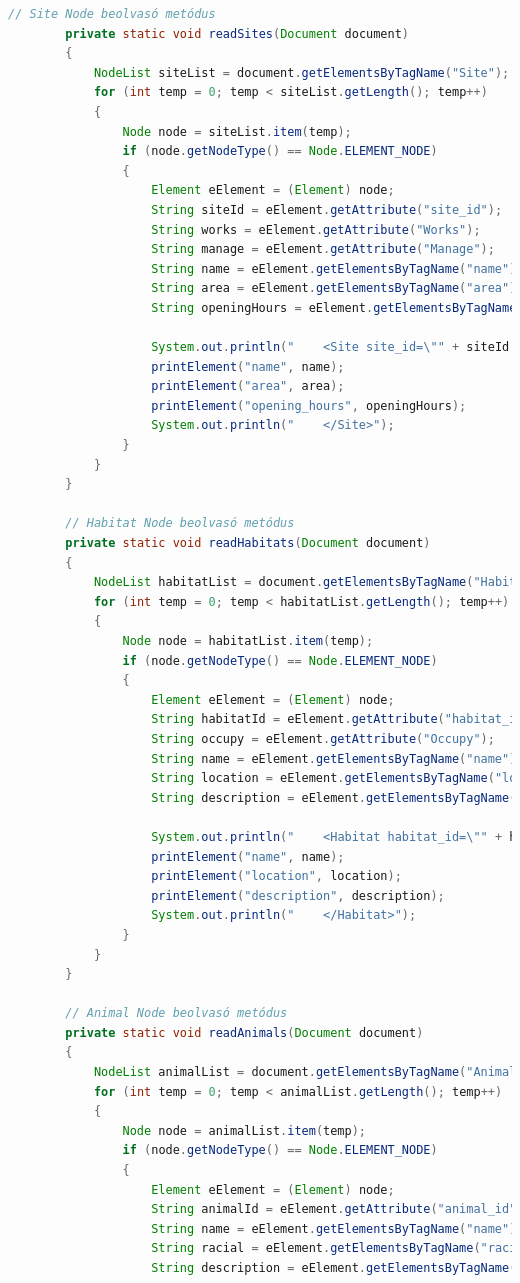 \documentclass[12pt]{report}
\begin{document}
\begin{lstlisting}[caption={DOMReadKLNSPG.java} olvasó program, language=Java]
		// Site Node beolvasó metódus
		private static void readSites(Document document) 
		{
			NodeList siteList = document.getElementsByTagName("Site");
			for (int temp = 0; temp < siteList.getLength(); temp++) 
			{
				Node node = siteList.item(temp);
				if (node.getNodeType() == Node.ELEMENT_NODE) 
				{
					Element eElement = (Element) node;
					String siteId = eElement.getAttribute("site_id");
					String works = eElement.getAttribute("Works");
					String manage = eElement.getAttribute("Manage");
					String name = eElement.getElementsByTagName("name").item(0).getTextContent();
					String area = eElement.getElementsByTagName("area").item(0).getTextContent();
					String openingHours = eElement.getElementsByTagName("opening_hours").item(0).getTextContent();
					
					System.out.println("    <Site site_id=\"" + siteId + "\" Works=\"" + works + "\" Manage=\"" + manage + "\">");
					printElement("name", name);
					printElement("area", area);
					printElement("opening_hours", openingHours);
					System.out.println("    </Site>");
				}
			}
		}
		
		// Habitat Node beolvasó metódus
		private static void readHabitats(Document document) 
		{
			NodeList habitatList = document.getElementsByTagName("Habitat");
			for (int temp = 0; temp < habitatList.getLength(); temp++) 
			{
				Node node = habitatList.item(temp);
				if (node.getNodeType() == Node.ELEMENT_NODE) 
				{
					Element eElement = (Element) node;
					String habitatId = eElement.getAttribute("habitat_id");
					String occupy = eElement.getAttribute("Occupy");
					String name = eElement.getElementsByTagName("name").item(0).getTextContent();
					String location = eElement.getElementsByTagName("location").item(0).getTextContent();
					String description = eElement.getElementsByTagName("description").item(0).getTextContent();
					
					System.out.println("    <Habitat habitat_id=\"" + habitatId + "\" Occupy=\"" + occupy + "\">");
					printElement("name", name);
					printElement("location", location);
					printElement("description", description);
					System.out.println("    </Habitat>");
				}
			}
		}
		
		// Animal Node beolvasó metódus
		private static void readAnimals(Document document) 
		{
			NodeList animalList = document.getElementsByTagName("Animal");
			for (int temp = 0; temp < animalList.getLength(); temp++) 
			{
				Node node = animalList.item(temp);
				if (node.getNodeType() == Node.ELEMENT_NODE) 
				{
					Element eElement = (Element) node;
					String animalId = eElement.getAttribute("animal_id");
					String name = eElement.getElementsByTagName("name").item(0).getTextContent();
					String racial = eElement.getElementsByTagName("racial").item(0).getTextContent();
					String description = eElement.getElementsByTagName("description").item(0).getTextContent();
					

\end{lstlisting}
\end{document}
